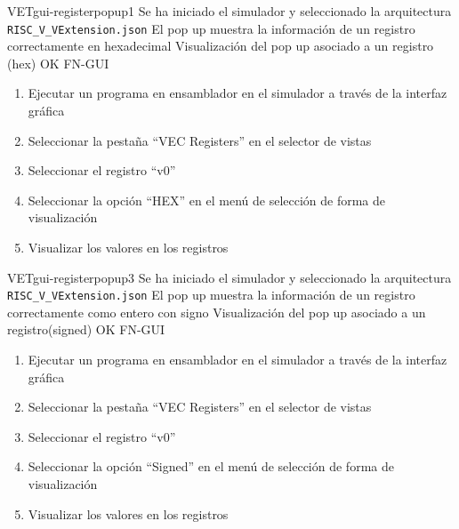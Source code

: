 \begin{testCase}{VET}{gui-registerpopup1}
    {Se ha iniciado el simulador y seleccionado la arquitectura \texttt{RISC\_V\_VExtension.json}}
    {El pop up muestra la información de un registro correctamente en hexadecimal}
    {Visualización del pop up asociado a un registro (hex)} %
    {OK} %
    {FN-GUI}
    \begin{enumerate}
        \item Ejecutar un programa en ensamblador en el simulador a través de la interfaz gráfica
        \item Seleccionar la pestaña ``VEC Registers'' en el selector de vistas
        \item Seleccionar el registro ``v0''
        \item Seleccionar la opción ``HEX'' en el menú de selección de forma de visualización
        \item Visualizar los valores en los registros
    \end{enumerate}
\end{testCase}

\begin{testCase}{VET}{gui-registerpopup3}
    {Se ha iniciado el simulador y seleccionado la arquitectura \texttt{RISC\_V\_VExtension.json}}
    {El pop up muestra la información de un registro correctamente como entero con signo}
    {Visualización del pop up asociado a un registro(signed)} %
    {OK} %
    {FN-GUI}
    \begin{enumerate}
        \item Ejecutar un programa en ensamblador en el simulador a través de la interfaz gráfica
        \item Seleccionar la pestaña ``VEC Registers'' en el selector de vistas
        \item Seleccionar el registro ``v0''
        \item Seleccionar la opción ``Signed'' en el menú de selección de forma de visualización
        \item Visualizar los valores en los registros
    \end{enumerate}
\end{testCase}

